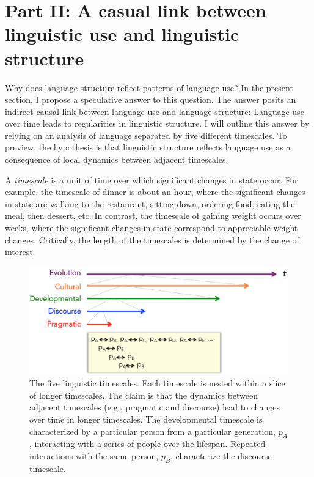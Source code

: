 \documentclass[man, noapacite, 12pt]{apa2}
\begin{document}
 
\section{Part II: A casual link between linguistic use and linguistic structure}
Why does language structure reflect  patterns of language use? In the present section, I propose a speculative answer to this question. The answer  posits an indirect causal link between language use and language structure: Language use over time leads to regularities in linguistic structure. I will outline this answer by relying on an analysis of language separated by five different timescales. To preview, the hypothesis is that linguistic structure reflects language use as a consequence of local dynamics between adjacent timescales.

A {\it timescale} is a unit of time over which significant changes in state occur. For example, the timescale of dinner is about an hour, where the significant changes in state are walking to the restaurant, sitting down, ordering food, eating the meal, then dessert, etc. In contrast, the timescale of gaining weight occurs over weeks, where the significant changes in state correspond to appreciable weight changes. Critically, the length of the timescales is determined by the change of interest. 

\begin{figure}
\begin{center} 
\includegraphics[width=6in]{figs/timescales1}
\caption{The five linguistic timescales. Each timescale is nested within a slice of longer timescales. The claim is that the dynamics between adjacent timescales (e.g., pragmatic and discourse) lead to changes over time in longer timescales. The developmental timescale is characterized by a particular person from a particular generation, $p_A$, interacting with a series of people over the lifespan. Repeated interactions with the same person, $p_B$, characterize the discourse timescale.}
\end{center} 
\end{figure}
\end{document}
